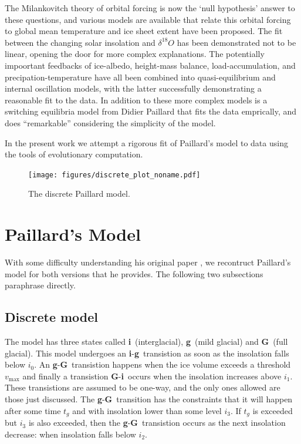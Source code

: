 The Milankovitch theory of orbital forcing is now the `null hypothesis' answer to these questions, and various models are available that relate this orbital forcing to global mean temperature and ice sheet extent have been proposed.
The fit between the changing solar insolation and $\delta ^{18} O$ has been demonstrated not to be linear, opening the door for more complex explanations.
The potentially impoortant feedbacks of ice-albedo, height-mass balance, load-accumulation, and precipation-temperature have all been combined into quasi-equilibrium and internal oscillation models, with the latter successfully demonstrating a reasonable fit to the data.
In addition to these more complex models is a switching equilibria model from Didier Paillard that fits the data emprically, and does ``remarkable'' considering the simplicity of the model.

In the present work we attempt a rigorous fit of Paillard's model to data using the tools of evolutionary computation.

\begin{figure}[tpb!]
\centering
  \texttt{[image: figures/discrete\_plot\_noname.pdf]}
  \caption{
    The discrete Paillard model.
  }
  \label{fig:paillard-fig3}
\end{figure}

\section{Paillard's Model}

With some difficulty understanding his original paper \cite{paillard1998timing}, we recontruct Paillard's model for both versions that he provides.
The following two subsections paraphrase \cite{paillard1998timing} directly.

\subsection{Discrete model}

\newcommand{\inter}{\textbf{i}}
\newcommand{\mild}{\textbf{g}}
\newcommand{\full}{\textbf{G}}

The model has three states called \inter~(interglacial), \mild~(mild glacial) and \full~(full glacial).
This model undergoes an \inter-\mild~transistion as soon as the insolation falls below $i_0$.
An \mild-\full~transistion happens when the ice volume exceeds a threshold $v_\text{max}$ and finally a transistion \full-\inter~occurs when the insolation increases above $i_1$.
These transistions are assumed to be one-way, and the only ones allowed are those just discussed.
The \mild-\full~transition has the constraints that it will happen after some time $t_g$ and with insolation lower than some level $i_3$.
If $t_g$ is exceeded but $i_3$ is also exceeded, then the \mild-\full~transistion occurs as the next insolation decrease: when insolation falls below $i_2$.

